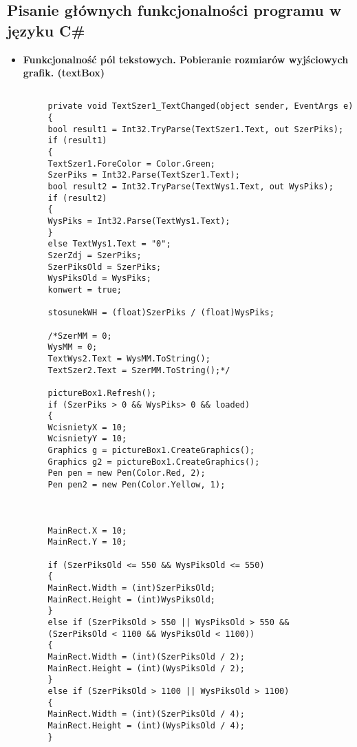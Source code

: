 \lstset{xleftmargin=-3.5cm}
\subsection{Pisanie głównych funkcjonalności programu w języku C\#}
\begin{itemize}
\item \textbf{Funkcjonalność pól tekstowych. Pobieranie rozmiarów wyjściowych grafik. (textBox)}\\
\begin{lstlisting}
	
	 private void TextSzer1_TextChanged(object sender, EventArgs e)
	 {
	 bool result1 = Int32.TryParse(TextSzer1.Text, out SzerPiks);
	 if (result1)
	 {
	 TextSzer1.ForeColor = Color.Green;
	 SzerPiks = Int32.Parse(TextSzer1.Text);
	 bool result2 = Int32.TryParse(TextWys1.Text, out WysPiks);
	 if (result2)
	 {
	 WysPiks = Int32.Parse(TextWys1.Text);
	 }
	 else TextWys1.Text = "0";
	 SzerZdj = SzerPiks;
	 SzerPiksOld = SzerPiks;
	 WysPiksOld = WysPiks;
	 konwert = true;
	 
	 stosunekWH = (float)SzerPiks / (float)WysPiks;
	 
	 /*SzerMM = 0;
	 WysMM = 0;
	 TextWys2.Text = WysMM.ToString();
	 TextSzer2.Text = SzerMM.ToString();*/
	 
	 pictureBox1.Refresh();
	 if (SzerPiks > 0 && WysPiks> 0 && loaded)
	 {
	 WcisnietyX = 10;                                                                                        
	 WcisnietyY = 10;                                                                                        
	 Graphics g = pictureBox1.CreateGraphics();
	 Graphics g2 = pictureBox1.CreateGraphics();
	 Pen pen = new Pen(Color.Red, 2);
	 Pen pen2 = new Pen(Color.Yellow, 1);
	 
	 
	 
	 MainRect.X = 10;
	 MainRect.Y = 10;
	 
	 if (SzerPiksOld <= 550 && WysPiksOld <= 550)                                                           
	 {
	 MainRect.Width = (int)SzerPiksOld;
	 MainRect.Height = (int)WysPiksOld;
	 }
	 else if (SzerPiksOld > 550 || WysPiksOld > 550 && 
	 (SzerPiksOld < 1100 && WysPiksOld < 1100))
	 {
	 MainRect.Width = (int)(SzerPiksOld / 2);
	 MainRect.Height = (int)(WysPiksOld / 2);
	 }
	 else if (SzerPiksOld > 1100 || WysPiksOld > 1100)
	 {
	 MainRect.Width = (int)(SzerPiksOld / 4);
	 MainRect.Height = (int)(WysPiksOld / 4);
	 }                                                                                              
	 

\end{lstlisting}
\end{itemize}
